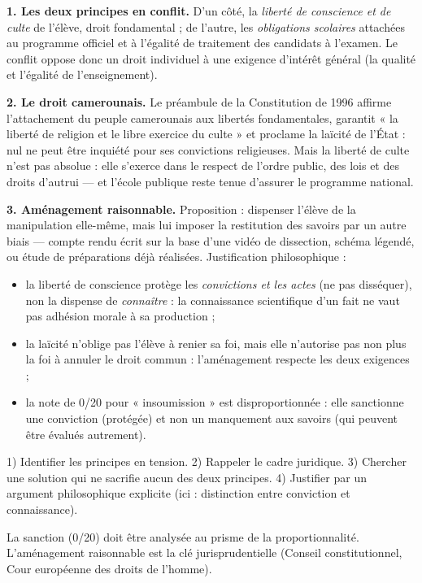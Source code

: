 \documentclass[11pt]{article}
\begin{document}
\begin{corrige}

\textbf{1. Les deux principes en conflit.} D'un côté, la \emph{liberté de conscience et de culte} de l'élève, droit fondamental ; de l'autre, les \emph{obligations scolaires} attachées au programme officiel et à l'égalité de traitement des candidats à l'examen. Le conflit oppose donc un droit individuel à une exigence d'intérêt général (la qualité et l'égalité de l'enseignement).

\textbf{2. Le droit camerounais.} Le préambule de la Constitution de 1996 affirme l'attachement du peuple camerounais aux libertés fondamentales, garantit « la liberté de religion et le libre exercice du culte » et proclame la laïcité de l'État : nul ne peut être inquiété pour ses convictions religieuses. Mais la liberté de culte n'est pas absolue : elle s'exerce dans le respect de l'ordre public, des lois et des droits d'autrui — et l'école publique reste tenue d'assurer le programme national.

\textbf{3. Aménagement raisonnable.} Proposition : dispenser l'élève de la manipulation elle-même, mais lui imposer la restitution des savoirs par un autre biais — compte rendu écrit sur la base d'une vidéo de dissection, schéma légendé, ou étude de préparations déjà réalisées. Justification philosophique :
\begin{itemize}
\item la liberté de conscience protège les \emph{convictions et les actes} (ne pas disséquer), non la dispense de \emph{connaître} : la connaissance scientifique d'un fait ne vaut pas adhésion morale à sa production ;
\item la laïcité n'oblige pas l'élève à renier sa foi, mais elle n'autorise pas non plus la foi à annuler le droit commun : l'aménagement respecte les deux exigences ;
\item la note de 0/20 pour « insoumission » est disproportionnée : elle sanctionne une conviction (protégée) et non un manquement aux savoirs (qui peuvent être évalués autrement).
\end{itemize}
\end{corrige}
\begin{methode}
1) Identifier les principes en tension. 2) Rappeler le cadre juridique. 3) Chercher une solution qui ne sacrifie aucun des deux principes. 4) Justifier par un argument philosophique explicite (ici : distinction entre conviction et connaissance).
\end{methode}
\begin{attention}
La sanction (0/20) doit être analysée au prisme de la proportionnalité. L'aménagement raisonnable est la clé jurisprudentielle (Conseil constitutionnel, Cour européenne des droits de l'homme).
\end{attention}
\end{document}
